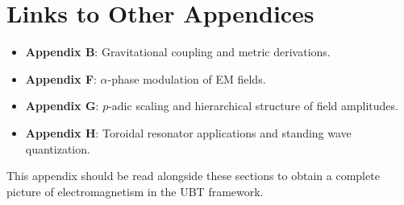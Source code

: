 \section{Links to Other Appendices}
\begin{itemize}
    \item \textbf{Appendix B}: Gravitational coupling and metric derivations.
    \item \textbf{Appendix F}: $\alpha$-phase modulation of EM fields.
    \item \textbf{Appendix G}: $p$-adic scaling and hierarchical structure of field amplitudes.
    \item \textbf{Appendix H}: Toroidal resonator applications and standing wave quantization.
\end{itemize}

This appendix should be read alongside these sections to obtain a complete picture of electromagnetism in the UBT framework.
